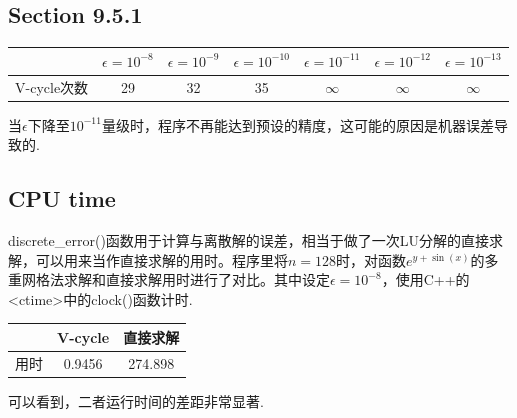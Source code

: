 \documentclass[a4paper,11.5pt,UTF8]{ctexart}
\begin{document}
\begin{large}
\subsection{Section 9.5.1 \uppercase\expandafter{}}
\begin{center}
	\begin{tabular}{|c|c|c|c|c|c|c|}
		\hline
		& $\epsilon=10^{-8}$ & $\epsilon=10^{-9}$ & $\epsilon=10^{-10}$ & $\epsilon=10^{-11}$ & $\epsilon=10^{-12}$ & $\epsilon=10^{-13}$ \\
		\hline
		V-cycle次数 & 29 & 32 & 35 & $\infty$ & $\infty$ & $\infty$ \\
		\hline
	\end{tabular}
\end{center}
当$\epsilon$下降至$10^{-11}$量级时，程序不再能达到预设的精度，这可能的原因是机器误差导致的.

\subsection{CPU time}
\par discrete\_error()函数用于计算与离散解的误差，相当于做了一次LU分解的直接求解，可以用来当作直接求解的用时。程序里将$n=128$时，对函数$e^{y+\sin(x)}$的多重网格法求解和直接求解用时进行了对比。其中设定$\epsilon=10^{-8}$，使用C++的<ctime>中的clock()函数计时.
\begin{center}
	\begin{tabular}{|c|c|c|}
		\hline
		 & V-cycle & 直接求解 \\
		 \hline
		用时 & 0.9456 & 274.898 \\
		\hline
	\end{tabular}
\end{center}
可以看到，二者运行时间的差距非常显著.



\end{large}
\end{document}
